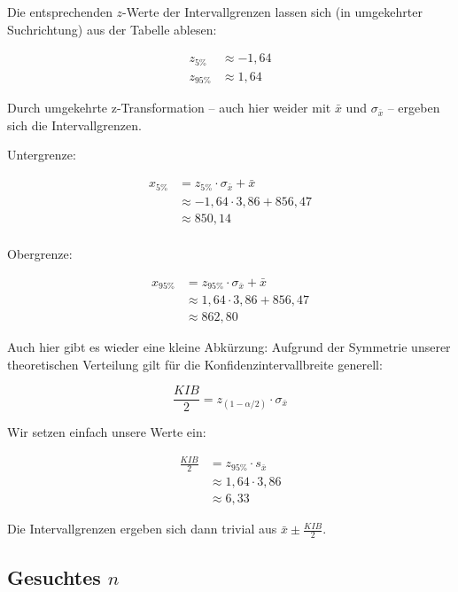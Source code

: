 \documentclass[
  11pt,
  ngerman,
  a4paper,
]{report}
\begin{document}
Die entsprechenden \(z\)-Werte der Intervallgrenzen lassen sich (in umgekehrter Suchrichtung) aus der Tabelle ablesen:

\nopagebreak

\[\begin{aligned}
z_{5\%}&\approx-1{,}64\\[4pt]
z_{95\%}&\approx 1{,}64
\end{aligned}\]

Durch umgekehrte z-Transformation -- auch hier weider mit \(\bar{x}\) und \(\sigma_{\bar{x}}\) -- ergeben sich die Intervallgrenzen.

Untergrenze:

\nopagebreak

\[\begin{aligned}
x_{5\%} &= z_{5\%} \cdot \sigma_{\bar{x}} + \bar{x}\\[4pt]
&\approx -1{,}64 \cdot 3,86 + 856{,}47\\[4pt]
&\approx 850,14\\[6pt]
\end{aligned}\]

Obergrenze:

\nopagebreak

\[
\begin{aligned}
x_{95\%}&= z_{95\%} \cdot \sigma_{\bar{x}} + \bar{x}\\[4pt]
&\approx 1{,}64 \cdot 3,86 + 856{,}47\\[4pt]
&\approx 862,80
\end{aligned}\]

Auch hier gibt es wieder eine kleine Abkürzung: Aufgrund der Symmetrie unserer theoretischen Verteilung gilt für die Konfidenzintervallbreite generell:

\nopagebreak

\[
\frac{\mathit{KIB}}{2} = z_{(1-\alpha/2)} \cdot \sigma_{\bar{x}}
\label{eq:kib}
\]

Wir setzen einfach unsere Werte ein:

\nopagebreak

\[\begin{aligned}
\frac{\mathit{KIB}}{2} &= z_{95\%} \cdot s_{\bar{x}}\\[4pt]
&\approx1{,}64 \cdot 3,86\\[4pt]
&\approx 6,33
\end{aligned}\]

Die Intervallgrenzen ergeben sich dann trivial aus \(\bar{x} \pm \frac{\mathit{KIB}}{2}\).

\hypertarget{gesuchtes-n}{%
\subsection{\texorpdfstring{Gesuchtes \(n\)}{Gesuchtes n}}\label{gesuchtes-n}}
\end{document}
